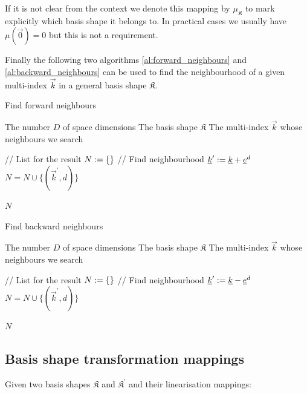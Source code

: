 If it is not clear from the context we denote this mapping by $\mu_{\mathfrak{K}}$
to mark explicitly which basis shape it belongs to. In practical cases we usually
have $\mu(\vec{0}) = 0$ but this is not a requirement.

Finally the following two algorithms \ref{al:forward_neighbours} and
\ref{al:backward_neighbours} can be used to find the neighbourhood
of a given multi-index $\vec{k}$ in a general basis shape $\mathfrak{K}$.

\begin{algorithm}
  \caption{Find forward neighbours}
  \label{al:forward_neighbours}
  \begin{algorithmic}
    \REQUIRE The number $D$ of space dimensions
    \REQUIRE The basis shape $\mathfrak{K}$
    \REQUIRE The multi-index $\vec{k}$ whose neighbours we search

    \STATE // List for the result
    \STATE $N := \{\}$
    \STATE // Find neighbourhood
      \STATE $\underline{k}^\prime := \underline{k} + \underline{e}^d$
        \STATE $N = N \cup \{(\vec{k}^\prime, d)\}$
      \ENDIF
    \ENDFOR

    \RETURN $N$
  \end{algorithmic}
\end{algorithm}

\begin{algorithm}
  \caption{Find backward neighbours}
  \label{al:backward_neighbours}
  \begin{algorithmic}
    \REQUIRE The number $D$ of space dimensions
    \REQUIRE The basis shape $\mathfrak{K}$
    \REQUIRE The multi-index $\vec{k}$ whose neighbours we search

    \STATE // List for the result
    \STATE $N := \{\}$
    \STATE // Find neighbourhood
      \STATE $\underline{k}^\prime := \underline{k} - \underline{e}^d$
        \STATE $N = N \cup \{(\vec{k}^\prime, d)\}$
      \ENDIF
    \ENDFOR

    \RETURN $N$
  \end{algorithmic}
\end{algorithm}


\subsection{Basis shape transformation mappings}


Given two basis shapes $\mathfrak{K}$ and $\mathfrak{K}^\prime$ and their
linearisation mappings:

